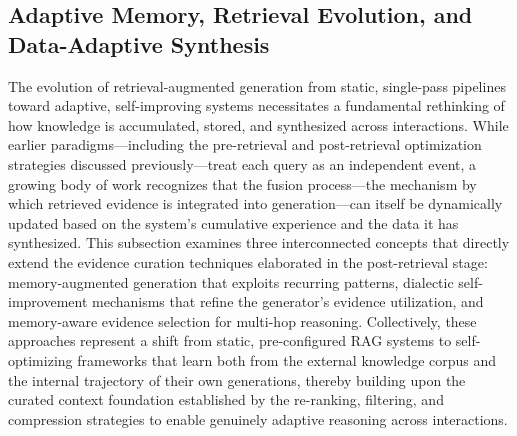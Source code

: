 \documentclass[11pt,a4paper]{article}
\begin{document}
\subsection{Adaptive Memory, Retrieval Evolution, and Data-Adaptive Synthesis}


The evolution of retrieval-augmented generation from static, single-pass pipelines toward adaptive, self-improving systems necessitates a fundamental rethinking of how knowledge is accumulated, stored, and synthesized across interactions. While earlier paradigms---including the pre-retrieval and post-retrieval optimization strategies discussed previously---treat each query as an independent event, a growing body of work recognizes that the fusion process---the mechanism by which retrieved evidence is integrated into generation---can itself be dynamically updated based on the system's cumulative experience and the data it has synthesized. This subsection examines three interconnected concepts that directly extend the evidence curation techniques elaborated in the post-retrieval stage: memory-augmented generation that exploits recurring patterns, dialectic self-improvement mechanisms that refine the generator's evidence utilization, and memory-aware evidence selection for multi-hop reasoning. Collectively, these approaches represent a shift from static, pre-configured RAG systems to self-optimizing frameworks that learn both from the external knowledge corpus and the internal trajectory of their own generations, thereby building upon the curated context foundation established by the re-ranking, filtering, and compression strategies to enable genuinely adaptive reasoning across interactions.
\end{document}
